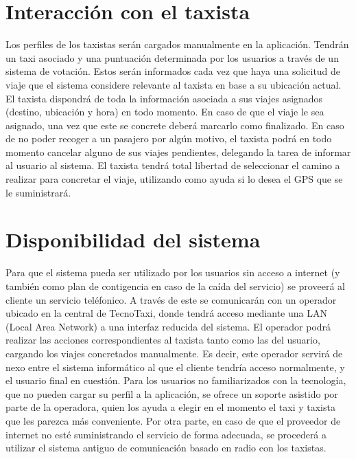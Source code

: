 \section{Interacción con el taxista}
Los perfiles de los taxistas serán cargados manualmente en la aplicación. Tendrán un taxi asociado y una puntuación determinada por los usuarios a través de un sistema de votación. Estos serán informados cada vez que haya una solicitud de viaje que el sistema considere relevante al taxista en base a su ubicación actual. El taxista dispondrá de toda la información asociada a sus viajes asignados (destino, ubicación y hora) en todo momento. En caso de que el viaje le sea asignado, una vez que este se concrete deberá marcarlo como finalizado. En caso de no poder recoger a un pasajero por algún motivo, el taxista podrá en todo momento cancelar alguno de sus viajes pendientes, delegando la tarea de informar al usuario al sistema. El taxista tendrá total libertad de seleccionar el camino a realizar para concretar el viaje, utilizando como ayuda si lo desea el GPS que se le suministrará.

\section{Disponibilidad del sistema}
Para que el sistema pueda ser utilizado por los usuarios sin acceso a internet (y también como plan de contigencia en caso de la caída del servicio) se proveerá al cliente un servicio teléfonico. A través de este se comunicarán con un operador ubicado en la central de TecnoTaxi, donde tendrá acceso mediante una LAN (Local Area Network) a una interfaz reducida del sistema. El operador podrá realizar las acciones correspondientes al taxista tanto como las del usuario, cargando los viajes concretados manualmente.  Es decir, este operador servirá de nexo entre el sistema informático al que el cliente tendría acceso normalmente, y el usuario final en cuestión. Para los usuarios no familiarizados con la tecnolog\'ia, que no pueden cargar su perfil a la aplicaci\'on, se ofrece un soporte asistido por parte de la operadora, quien los ayuda a elegir en el momento el taxi y taxista que les parezca m\'as conveniente.  Por otra parte, en caso de que el proveedor de internet no esté suministrando el servicio de forma adecuada, se procederá a utilizar el sistema antiguo de comunicación basado en radio con los taxistas.


